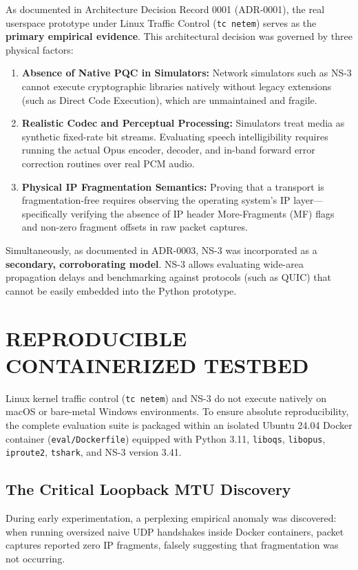 As documented in Architecture Decision Record 0001 (ADR-0001), the real userspace prototype under Linux Traffic Control (\texttt{tc netem}) serves as the \textbf{primary empirical evidence}. This architectural decision was governed by three physical factors:
\begin{enumerate}
    \item \textbf{Absence of Native PQC in Simulators:} Network simulators such as NS-3 cannot execute cryptographic libraries natively without legacy extensions (such as Direct Code Execution), which are unmaintained and fragile.
    \item \textbf{Realistic Codec and Perceptual Processing:} Simulators treat media as synthetic fixed-rate bit streams. Evaluating speech intelligibility requires running the actual Opus encoder, decoder, and in-band forward error correction routines over real PCM audio.
    \item \textbf{Physical IP Fragmentation Semantics:} Proving that a transport is fragmentation-free requires observing the operating system's IP layer—specifically verifying the absence of IP header More-Fragments (MF) flags and non-zero fragment offsets in raw packet captures.
\end{enumerate}

Simultaneously, as documented in ADR-0003, NS-3 was incorporated as a \textbf{secondary, corroborating model}. NS-3 allows evaluating wide-area propagation delays and benchmarking against protocols (such as QUIC) that cannot be easily embedded into the Python prototype.

\section{REPRODUCIBLE CONTAINERIZED TESTBED}
Linux kernel traffic control (\texttt{tc netem}) and NS-3 do not execute natively on macOS or bare-metal Windows environments. To ensure absolute reproducibility, the complete evaluation suite is packaged within an isolated Ubuntu 24.04 Docker container (\texttt{eval/Dockerfile}) equipped with Python 3.11, \texttt{liboqs}, \texttt{libopus}, \texttt{iproute2}, \texttt{tshark}, and NS-3 version 3.41.

\subsection{The Critical Loopback MTU Discovery}
During early experimentation, a perplexing empirical anomaly was discovered: when running oversized naive UDP handshakes inside Docker containers, packet captures reported zero IP fragments, falsely suggesting that fragmentation was not occurring.

